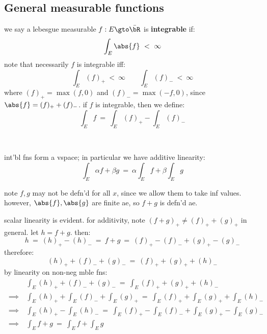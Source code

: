 \subsection{General measurable functions}

\begin{defn}
	we say a lebesgue measurable $f:E\gto\bar{\bR}$ is \textbf{integrable} if:
	\begin{equation*}
		\int_{E}\abs{f} \ < \ \infty
	\end{equation*}
	note that necessarily $f$ is integrable iff:
	\begin{equation*}
		\int_{E}(f)_{+} \ < \ \infty \qquad
		\int_{E}(f)_{-} \ < \ \infty
	\end{equation*}
	where $(f)_{+}=\max(f,0)$ and $(f)_{-}=\max(-f,0)$,
	since $\abs{f}=(f)_{+}+(f)_{-}$.
	if $f$ is integrable, then we define:
	\begin{equation*}
		\int_{E}f \ = \ \int_{E}(f)_{+} - \int_{E}(f)_{-}
	\end{equation*}
\end{defn} \

\begin{prop}
	int'bl fns form a vspace; in particular we have additive linearity:
	\begin{equation*}
		\int_{E}\alpha f+\beta g \ = \ \alpha\int_{E}f+\beta\int_{E}g
	\end{equation*}
\end{prop}
note $f,g$ may not be defn'd for all $x$, since we allow them to take inf values.
however, $\abs{f},\abs{g}$ are finite ae, so $f+g$ is defn'd ae.

\begin{pf}
	scalar linearity is evident.
	for additivity, note $(f+g)_{+}\neq(f)_{+}+(g)_{+}$ in general.
	let $h=f+g$. then:
	\begin{equation*}
		h \ = \ (h)_{+}-(h)_{-} \ = \ f+g \ = \ (f)_{+}-(f)_{-}+(g)_{+}-(g)_{-}
	\end{equation*}
	therefore:
	\begin{equation*}
		(h)_{+}+(f)_{-}+(g)_{-} \ = \ (f)_{+}+(g)_{+}+(h)_{-}
	\end{equation*}
	by linearity on non-neg mble fns:
	\begin{align*}
		& \int_{E}(h)_{+}+(f)_{-}+(g)_{-} \ = \ \int_{E}(f)_{+}+(g)_{+}+(h)_{-} \\
		\ \implies \ & \int_{E}(h)_{+}+\int_{E}(f)_{-}+\int_{E}(g)_{+}
		\ = \ \int_{E}(f)_{+}+\int_{E}(g)_{+}+\int_{E}(h)_{-} \\
		\ \implies \ & \int_{E}(h)_{+}-\int_{E}(h)_{-}
		\ = \ \int_{E}(f)_{+}-\int_{E}(f)_{-}+\int_{E}(g)_{+}-\int_{E}(g)_{-} \\
		\ \implies \ & \int_{E}f+g \ = \ \int_{E}f+\int_{E}g
	\end{align*}
\end{pf} \

